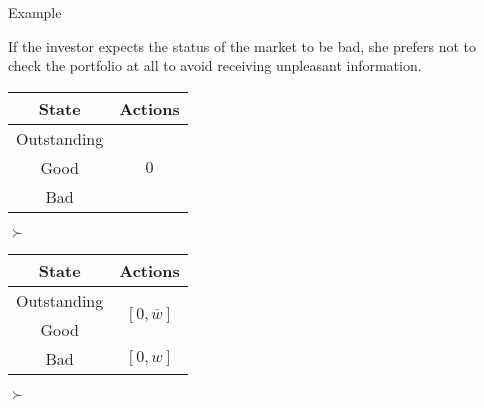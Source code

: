\documentclass[usenames,dvipsnames,aspectratio=169,11pt, envcountsect, handout]{beamer}
\begin{document}
\begin{frame}{Example}

	If the investor expects the status of the market to be bad, she prefers not to check the portfolio at all to avoid receiving unpleasant information.

	\vfill

	\begin{table}[H]
		\centering
		\begin{minipage}{0.29\textwidth}
			\centering
			\begin{tabular}{c | c}
				State       & Actions                   \\
				\hline
				Outstanding & \multirow{3}{*}{ \( 0 \)} \\
				Good        &                           \\
				Bad         &                           \\
			\end{tabular}
			\vspace{0.5cm} %
		\end{minipage}\hspace{0.3cm} %
		\( \succ \) %
		\begin{minipage}{0.29\textwidth}
			\centering
			\begin{tabular}{c | c}
				State                             & Actions                                                                    \\
				\hline
				{\color{bleudefrance}Outstanding} & \multirow{2}{*}{{\color{bleudefrance}\( \left[0, \overline{w} \right] \)}} \\
				{\color{bleudefrance}Good}        &                                                                            \\
				Bad                               & \( \left[0, w \right]\)                                                    \\
			\end{tabular}
			\vspace{0.5cm} %
		\end{minipage}\hspace{0.3cm} %
		\( \succ \) %
		\begin{minipage}{0.29\textwidth}
			\centering
			\begin{tabular}{c | c}

\end{tabular}
\end{minipage}
\end{table}
\end{frame}
\end{document}
